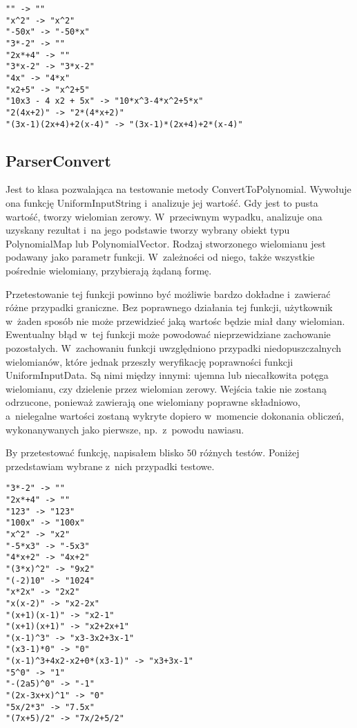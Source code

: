 \begin{lstlisting}
"" -> ""
"x^2" -> "x^2"
"-50x" -> "-50*x"
"3*-2" -> ""
"2x*+4" -> ""
"3*x-2" -> "3*x-2"
"4x" -> "4*x"
"x2+5" -> "x^2+5"
"10x3 - 4 x2 + 5x" -> "10*x^3-4*x^2+5*x"
"2(4x+2)" -> "2*(4*x+2)"
"(3x-1)(2x+4)+2(x-4)" -> "(3x-1)*(2x+4)+2*(x-4)"
\end{lstlisting}

\subsection{ParserConvert}

Jest to klasa pozwalająca na testowanie metody ConvertToPolynomial. Wywołuje ona funkcję UniformInputString i~analizuje jej wartość. Gdy jest to pusta wartość, tworzy wielomian zerowy. W~przeciwnym wypadku, analizuje ona uzyskany rezultat i~na jego podstawie tworzy wybrany obiekt typu PolynomialMap lub PolynomialVector. Rodzaj stworzonego wielomianu jest podawany jako parametr funkcji. W~zależności od niego, także wszystkie pośrednie wielomiany, przybierają żądaną formę.

Przetestowanie tej funkcji powinno być możliwie bardzo dokładne i~zawierać różne przypadki graniczne. Bez poprawnego działania tej funkcji, użytkownik w~żaden sposób nie może przewidzieć jaką wartośc będzie miał dany wielomian. Ewentualny błąd w~tej funkcji może powodować nieprzewidziane zachowanie pozostałych. W~zachowaniu funkcji uwzględniono przypadki niedopuszczalnych wielomianów, które jednak przeszły weryfikację poprawności funkcji UniformInputData. Są nimi między innymi: ujemna lub niecałkowita potęga wielomianu, czy dzielenie przez wielomian zerowy. Wejścia takie nie zostaną odrzucone, ponieważ zawierają one wielomiany poprawne składniowo, a~nielegalne wartości zostaną wykryte dopiero w~momencie dokonania obliczeń, wykonanywanych jako pierwsze, np.\ z~powodu nawiasu.

By przetestować funkcję, napisałem blisko $50$ różnych testów. Poniżej przedstawiam wybrane z~nich przypadki testowe.

\begin{lstlisting}
"3*-2" -> ""
"2x*+4" -> ""
"123" -> "123"
"100x" -> "100x"
"x^2" -> "x2"
"-5*x3" -> "-5x3"
"4*x+2" -> "4x+2"
"(3*x)^2" -> "9x2"
"(-2)10" -> "1024"
"x*2x" -> "2x2"
"x(x-2)" -> "x2-2x"
"(x+1)(x-1)" -> "x2-1"
"(x+1)(x+1)" -> "x2+2x+1"
"(x-1)^3" -> "x3-3x2+3x-1"
"(x3-1)*0" -> "0"
"(x-1)^3+4x2-x2+0*(x3-1)" -> "x3+3x-1"
"5^0" -> "1"
"-(2a5)^0" -> "-1"
"(2x-3x+x)^1" -> "0"
"5x/2*3" -> "7.5x"
"(7x+5)/2" -> "7x/2+5/2"
\end{lstlisting}

